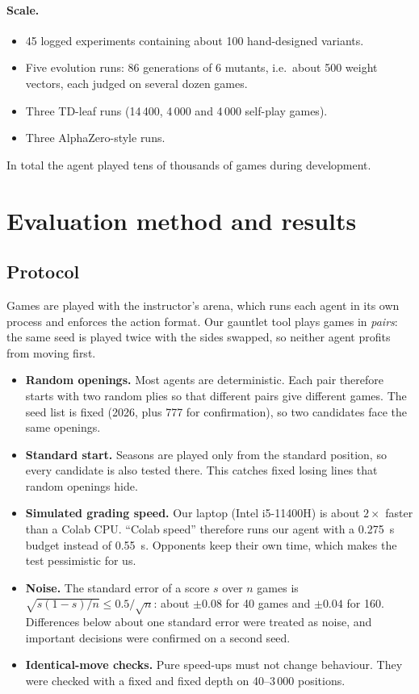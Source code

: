 \paragraph{Scale.}
\begin{itemize}
  \item 45 logged experiments containing about 100 hand-designed variants.
  \item Five evolution runs: 86 generations of 6 mutants, i.e.\ about 500 weight vectors, each
        judged on several dozen games.
  \item Three TD-leaf runs (14\,400, 4\,000 and 4\,000 self-play games).
  \item Three AlphaZero-style runs.
\end{itemize}
In total the agent played tens of thousands of games during development.

\section{Evaluation method and results}
\label{sec:evaluation}

\subsection{Protocol}
\label{sec:protocol}
Games are played with the instructor's arena, which runs each agent in its own process and
enforces the action format. Our gauntlet tool plays games in \emph{pairs}: the same seed is
played twice with the sides swapped, so neither agent profits from moving first.
\begin{itemize}
  \item \textbf{Random openings.} Most agents are deterministic. Each pair therefore starts with
        two random plies so that different pairs give different games. The seed list is fixed
        (2026, plus 777 for confirmation), so two candidates face the same openings.
  \item \textbf{Standard start.} Seasons are played only from the standard position, so every
        candidate is also tested there. This catches fixed losing lines that random openings
        hide.
  \item \textbf{Simulated grading speed.} Our laptop (Intel i5-11400H) is about $2\times$ faster
        than a Colab CPU. ``Colab speed'' therefore runs our agent with a
        \SI{0.275}{\second} budget instead of \SI{0.55}{\second}. Opponents keep their own time,
        which makes the test pessimistic for us.
  \item \textbf{Noise.} The standard error of a score $s$ over $n$ games is
        $\sqrt{s(1-s)/n}\le 0.5/\sqrt{n}$: about $\pm0.08$ for 40 games and $\pm0.04$ for 160.
        Differences below about one standard error were treated as noise, and important
        decisions were confirmed on a second seed.
  \item \textbf{Identical-move checks.} Pure speed-ups must not change behaviour. They were
        checked with a fixed  and fixed depth on 40--3\,000 positions.
\end{itemize}

